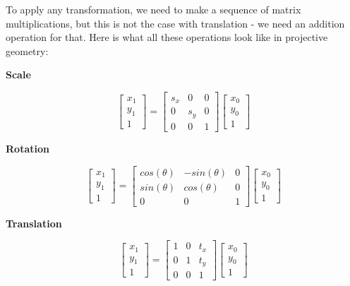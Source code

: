 To apply any transformation, we need to make a sequence of matrix multiplications, but this is not the case with translation - we need an addition operation for that. Here is what all these operations look like in projective geometry:

\begin{center}
    \textbf{Scale}
\end{center}
$$
\begin{bmatrix}
    x_1 \\ y_1 \\ 1
\end{bmatrix} = 
\begin{bmatrix}
    s_x & 0 & 0\\
    0 & s_y & 0\\
    0 & 0 & 1
\end{bmatrix}
\begin{bmatrix}
    x_0 \\ y_0 \\ 1
\end{bmatrix}
$$ 
\begin{center}
    \textbf{Rotation}    
\end{center}
$$
\begin{bmatrix}
    x_1 \\ y_1 \\ 1
\end{bmatrix} = 
\begin{bmatrix}
    cos(\theta) & -sin(\theta) & 0 \\
    sin(\theta) & cos(\theta)  & 0 \\
    0 & 0 & 1
\end{bmatrix}
\begin{bmatrix}
    x_0 \\ y_0 \\ 1
\end{bmatrix}
$$
\begin{center}
    \textbf{Translation}    
\end{center}
$$
\begin{bmatrix}
    x_1 \\ y_1 \\ 1
\end{bmatrix} = 
\begin{bmatrix}
    1 & 0 & t_x\\
    0 & 1 & t_y\\
    0 & 0 & 1
\end{bmatrix}
\begin{bmatrix}
    x_0 \\ y_0 \\ 1
\end{bmatrix}
$$ 

